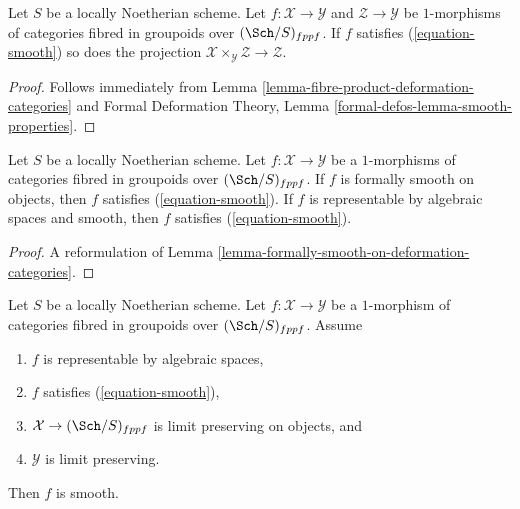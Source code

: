 \begin{lemma}
\label{lemma-base-change-smooth}
Let $S$ be a locally Noetherian scheme. Let $f : \mathcal{X} \to \mathcal{Y}$
and $\mathcal{Z} \to \mathcal{Y}$ be $1$-morphisms of
categories fibred in groupoids over $(\Sch/S)_{fppf}$. If $f$
satisfies (\ref{equation-smooth}) so does the projection
$\mathcal{X} \times_\mathcal{Y} \mathcal{Z} \to \mathcal{Z}$.
\end{lemma}

\begin{proof}
Follows immediately from
Lemma \ref{lemma-fibre-product-deformation-categories}
and
Formal Deformation Theory, Lemma
\ref{formal-defos-lemma-smooth-properties}.
\end{proof}

\begin{lemma}
\label{lemma-smooth-smooth}
Let $S$ be a locally Noetherian scheme. Let $f : \mathcal{X} \to \mathcal{Y}$
be a $1$-morphisms of categories fibred in groupoids over $(\Sch/S)_{fppf}$.
If $f$ is formally smooth on objects, then $f$ satisfies
(\ref{equation-smooth}). If $f$ is representable by algebraic spaces
and smooth, then $f$ satisfies (\ref{equation-smooth}).
\end{lemma}

\begin{proof}
A reformulation of Lemma \ref{lemma-formally-smooth-on-deformation-categories}.
\end{proof}

\begin{lemma}
\label{lemma-implies-smooth}
Let $S$ be a locally Noetherian scheme. Let $f : \mathcal{X} \to \mathcal{Y}$
be a $1$-morphism of categories fibred in groupoids over $(\Sch/S)_{fppf}$.
Assume
\begin{enumerate}
\item $f$ is representable by algebraic spaces,
\item $f$ satisfies (\ref{equation-smooth}),
\item $\mathcal{X} \to (\Sch/S)_{fppf}$ is limit preserving on objects, and
\item $\mathcal{Y}$ is limit preserving.
\end{enumerate}
Then $f$ is smooth.
\end{lemma}


